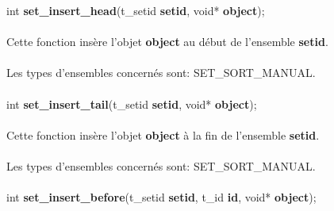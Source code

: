 \documentclass[10pt,a4wide]{article}
\begin{document}
\hspace{1.5cm}int \textbf{set\_insert\_head}(t\_setid \textbf{setid},
                                             void* \textbf{object});

\paragraph{}

Cette fonction ins\`ere l'objet \textbf{object} au d\'ebut de l'ensemble
\textbf{setid}.

\paragraph{}

Les types d'ensembles concern\'es sont: SET\_SORT\_MANUAL.

\paragraph{}

\hspace{1.5cm}int \textbf{set\_insert\_tail}(t\_setid \textbf{setid},
                                             void* \textbf{object});

\paragraph{}

Cette fonction ins\`ere l'objet \textbf{object} \`a la fin de l'ensemble
\textbf{setid}.

\paragraph{}

Les types d'ensembles concern\'es sont: SET\_SORT\_MANUAL.

\paragraph{}

\hspace{1.5cm}int \textbf{set\_insert\_before}(t\_setid \textbf{setid},
                                               t\_id \textbf{id},
                                               void* \textbf{object});

\paragraph{}
\end{document}
